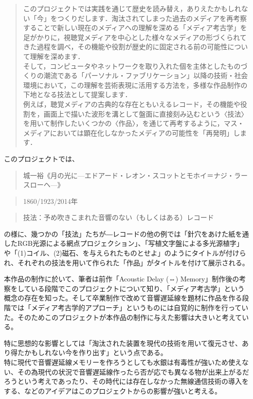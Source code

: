 \begin{quote}
このプロジェクトでは実践を通じて歴史を読み替え，ありえたかもしれない「今」をつくりだします．淘汰されてしまった過去のメディアを再考察することで新しい現在のメディアへの理解を深める「メディア考古学」を足がかりに，視聴覚メディアを中心とした様々なメディアの形づくられてきた過程を調べ，その機能や役割が歴史的に固定される前の可能性について理解を深めます．\\
そして，コンピュータやネットワークを取り入れた個を主体としたものづくりの潮流である「パーソナル・ファブリケーション」以降の技術・社会環境において，この理解を芸術表現に活用する方法を，多様な作品制作の下地となる技法として提案します．\\
例えば，聴覚メディアの古典的な存在ともいえるレコード，その機能や役割を，画面上で描いた波形を溝として盤面に直接刻み込むという〈技法〉を用いて制作したいくつかの〈作品〉，を通じて再考するように，マス・メディアにおいては顕在化しなかったメディアの可能性を「再発明」します．\\
\autocite{iamas:RIWP}
\end{quote}

このプロジェクトでは、

\begin{quote}
城一裕《月の光に---エドアード・レオン・スコットとモホイ＝ナジ・ラースローヘ---》
\end{quote}

\begin{quote}
1860/1923/2014年
\end{quote}

\begin{quote}
技法：予め吹きこまれた音響のない（もしくはある）レコード
\end{quote}

の様に、幾つかの「技法」たちが―レコードの他の例では「針穴をあけた紙を通したRGB光源による網点プロジェクション」、「写植文字盤による多光源植字」や「(1)コイル、(2)磁石、を与えられたものとせよ」のようにタイトルが付けられ、それぞれの技法を用いて作られた「作品」がタイトルを付けて展示される。

本作品の制作に於いて、筆者は前作「Acoustic Delay (⇔)
Memory」制作後の考察をしている段階でこのプロジェクトについて知り、「メディア考古学」という概念の存在を知った。そして卒業制作で改めて音響遅延線を題材に作品を作る段階では「メディア考古学的アプローチ」というものには自覚的に制作を行っていた。そのためこのプロジェクトが本作品の制作に与えた影響は大きいと考えている。

特に思想的な影響としては「淘汰された装置を現代の技術を用いて復元させ、あり得たかもしれない今を作り出す」という点である。\\
特に現代で音響遅延線メモリーを作ろうとしても水銀は有毒性が強いため使えない、その為現代の状況で音響遅延線作ったら否が応でも異なる物が出来上がるだろうという考えであったり、その時代には存在しなかった無線通信技術の導入をする、などのアイデアはこのプロジェクトからの影響が強いと考える。

